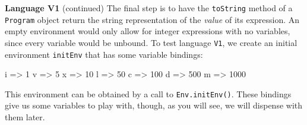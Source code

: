 \begin{minipage}[t]{\sw}
\slidenumber
\LARGE
{\bf Language V1} (continued)\exx
The final step is to have the \verb'toString' method
of a \verb'Program' object return the string representation
of the {\em value} of its expression.\exx
An empty environment would only allow for integer expressions
with no variables, since every variable would be unbound.
To test language \verb'V1', we create an initial environment \verb'initEnv'
that has some variable bindings:
\begin{qv}
i => 1
v => 5
x => 10
l => 50
c => 100
d => 500
m => 1000
\end{qv}
This environment can be obtained by a call to \verb'Env.initEnv()'.
These bindings give us some variables to play with,
though, as you will see, we will dispense with them later.\exx
\end{minipage}
